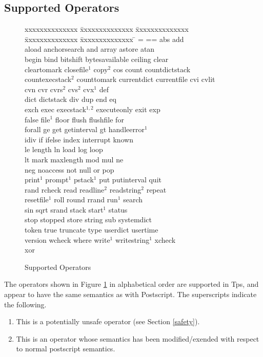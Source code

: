\subsection{Supported Operators}
\begin{figure}[t]\centering
\begin{tabbing}
xxxxxxxxxxxxxx \= xxxxxxxxxxxxxx \= xxxxxxxxxxxxxx \= xxxxxxxxxxxxxx \= xxxxxxxxxxxxxx \= \kill
[ \> ] \> = \> == \> abs \> add \\
aload \> anchorsearch \> and \> array \> astore \> atan \\
begin \> bind \> bitshift \> bytesavailable \> ceiling \> clear \\
cleartomark \> closefile$^{1}$ \> copy$^{2}$ \> cos \> count \> countdictstack \\
countexecstack$^{2}$ \> counttomark \> currentdict \> currentfile \> cvi \> cvlit \\
cvn \> cvr \> cvrs$^{2}$ \> cvs$^{2}$ \> cvx$^{1}$ \> def \\
dict \> dictstack \> div \> dup \> end \> eq \\
exch \> exec \> execstack$^{1,2}$ \> executeonly \> exit \> exp \\
false \> file$^{1}$ \> floor \> flush \> flushfile \> for \\
forall \> ge \> get \> getinterval \> gt \> handleerror$^{1}$ \\
idiv \> if \> ifelse \> index \> interrupt \> known \\
le \> length \> ln \> load \> log \> loop \\
lt \> mark \> maxlength \> mod \> mul \> ne \\
neg \> noaccess \> not \> null \> or \> pop \\
print$^{1}$ \> prompt$^{1}$ \> pstack$^{1}$ \> put \> putinterval \> quit \\
rand \> rcheck \> read \> readline$^{2}$ \> readstring$^{2}$ \> repeat \\
resetfile$^{1}$ \> roll \> round \> rrand \> run$^{1}$ \> search \\
sin \> sqrt \> srand \> stack \> start$^{1}$ \> status \\
stop \> stopped \> store \> string \> sub \> systemdict \\
token \> true \> truncate \> type \> userdict \> usertime \\
version \> wcheck \> where \> write$^{1}$ \> writestring$^{1}$ \> xcheck \\
xor \\
\end{tabbing}
\caption{Supported Operators}
\label{supported}
\end{figure}
The operators shown in Figure \ref{supported} in alphabetical order are
supported in Tps, and appear to have the same semantics as with Postscript.
The superscripts indicate the following.
\begin{enumerate}
\item This is a potentially unsafe operator (see Section \ref{safety}).
\item This is an operator whose semantics has been modified/exended
with respect to normal postscript semantics.
\end{enumerate}


